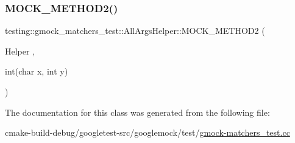 \subsubsection{\texorpdfstring{MOCK\_METHOD2()}{MOCK\_METHOD2()}}
{\footnotesize\ttfamily testing\+::gmock\+\_\+matchers\+\_\+test\+::\+All\+Args\+Helper\+::\+M\+O\+C\+K\+\_\+\+M\+E\+T\+H\+O\+D2 (\begin{DoxyParamCaption}\item[{Helper}]{,  }\item[{int(char x, int y)}]{ }\end{DoxyParamCaption})}



The documentation for this class was generated from the following file\+:\begin{DoxyCompactItemize}
\item 
cmake-\/build-\/debug/googletest-\/src/googlemock/test/\mbox{\hyperlink{gmock-matchers__test_8cc}{gmock-\/matchers\+\_\+test.\+cc}}\end{DoxyCompactItemize}
